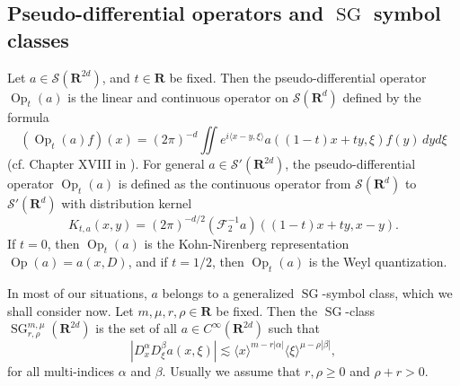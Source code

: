 \documentclass[12pt,a4paper,reqno]{amsart}
\numberwithin{equation}{section}
\numberwithin{thm}{section}
\theoremstyle{definition}
\theoremstyle{remark}
\begin{document}
\subsection{Pseudo-differential operators and ${\operatorname{SG}}$ symbol classes}\label{subs:1.3}
Let $a\in
\mathscr S({\mathbf R^{{2d}}})$, and $t\in \mathbf R$ be fixed. Then
the pseudo-differential operator ${\operatorname{Op}} _t(a)$ is the linear and
continuous operator on $\mathscr S({\mathbf R^{d}})$ defined by the formula
\begin{equation}\label{e0.5}
({\operatorname{Op}} _t(a)f)(x)
=
(2\pi ) ^{-d}\iint e^{i{\langle {x-y},\xi\rangle} } a((1-t)x+ty,\xi )f(y)\,
dyd\xi 
\end{equation}
(cf. Chapter XVIII in \cite {Ho1}). For
general $a\in \mathscr S'({\mathbf R^{{2d}}})$, the pseudo-differential
operator ${\operatorname{Op}} _t(a)$ is defined as the continuous operator from
$\mathscr S({\mathbf R^{d}})$ to $\mathscr S'({\mathbf R^{d}})$ with distribution
kernel
\begin{equation}\label{weylkernel}
K_{t,a}(x,y)=(2\pi )^{-d/2}(\mathscr F_2^{-1}a)((1-t)x+ty,x-y).
\end{equation}
If  $t=0$, then ${\operatorname{Op}} _t(a)$ is the Kohn-Nirenberg
representation ${\operatorname{Op}} (a)=a(x,D)$, and if $t=1/2$, then ${\operatorname{Op}} _t(a)$ is
the Weyl quantization. 

\par

In most of our situations, $a$ belongs to a generalized ${\operatorname{SG}}$-symbol
class, which we shall consider now.
Let $m,\mu ,r, \rho \in \mathbf R$
be fixed. Then the ${\operatorname{SG}}$-class ${\operatorname{SG}}
^{m,\mu }_{r,\rho}({\mathbf R^{{2d}}})$ is the set of all $a\in
C^\infty ({\mathbf R^{{2d}}})$ such that
$$
|D _x^\alpha D _\xi ^\beta a(x,\xi )|\lesssim
{\langle x\rangle}^{m-r|\alpha|}{\langle \xi\rangle} ^{\mu -\rho |\beta
|},
$$
for all multi-indices $\alpha$ and $\beta$. Usually we assume that
$r,\rho \ge 0$ and $\rho +r >0$.

\par
\end{document}
